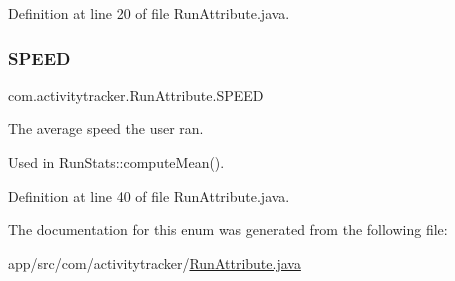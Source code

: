 Definition at line 20 of file Run\+Attribute.\+java.

\mbox{\label{enumcom_1_1activitytracker_1_1_run_attribute_a43fc543df9ec6dfaac73a5030abfafc4}} 
\subsubsection{\texorpdfstring{SPEED}{SPEED}}
{\footnotesize\ttfamily com.\+activitytracker.\+Run\+Attribute.\+S\+P\+E\+ED}

The average speed the user ran.

Used in Run\+Stats\+::compute\+Mean(). 

Definition at line 40 of file Run\+Attribute.\+java.



The documentation for this enum was generated from the following file\+:\begin{DoxyCompactItemize}
\item 
app/src/com/activitytracker/\mbox{\hyperlink{_run_attribute_8java}{Run\+Attribute.\+java}}\end{DoxyCompactItemize}
